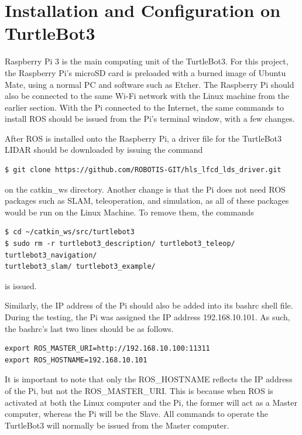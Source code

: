 \documentclass[12pt]{report}
\begin{document}
\section{Installation and Configuration on TurtleBot3}
Raspberry Pi 3 is the main computing unit of the TurtleBot3. For this project, the Raspberry Pi’s microSD card is preloaded with a burned image of Ubuntu Mate, using a normal PC and software such as Etcher. The Raspberry Pi should also be connected to the same Wi-Fi network with the Linux machine from the earlier section. With the Pi connected to the Internet, the same commands to install ROS should be issued from the Pi’s terminal window, with a few changes.\par
\vspace{1em}
After ROS is installed onto the Raspberry Pi, a driver file for the TurtleBot3 LIDAR should be downloaded by issuing the command
\begin{verbatim}
$ git clone https://github.com/ROBOTIS-GIT/hls_lfcd_lds_driver.git

\end{verbatim}
on the catkin\_ws directory. Another change is that the Pi does not need ROS packages such as SLAM, teleoperation, and simulation, as all of these packages would be run on the Linux Machine. To remove them, the commands
\begin{verbatim}
$ cd ~/catkin_ws/src/turtlebot3
$ sudo rm -r turtlebot3_description/ turtlebot3_teleop/ turtlebot3_navigation/ 
turtlebot3_slam/ turtlebot3_example/

\end{verbatim}
is issued.\par
\vspace{1em}

Similarly, the IP address of the Pi should also be added into its bashrc shell file. During the testing, the Pi was assigned the IP address 192.168.10.101. As such, the bashrc’s last two lines should be as follows.
\begin{verbatim}
export ROS_MASTER_URI=http://192.168.10.100:11311
export ROS_HOSTNAME=192.168.10.101

\end{verbatim}
It is important to note that only the ROS\_HOSTNAME reflects the IP address of the Pi, but not the ROS\_MASTER\_URI. This is because when ROS is activated at both the Linux computer and the Pi, the former will act as a Master computer, whereas the Pi will be the Slave. All commands to operate the TurtleBot3 will normally be issued from the Master computer.\par
\vspace{1em}
\end{document}
